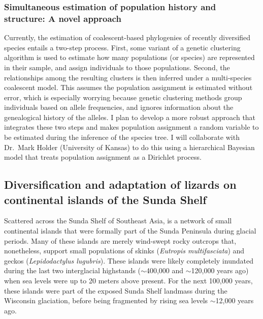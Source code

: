 \subsubsection*{Simultaneous estimation of population history and structure: A
novel approach}
Currently, the estimation of coalescent-based phylogenies of recently
diversified species entails a two-step process.
First, some variant of a genetic clustering algorithm is used to estimate how
many populations (or species) are represented in their sample, and assign
individuals to those populations.
Second, the relationships among the resulting clusters is then inferred under a
multi-species coalescent model.
This assumes the population assignment is estimated without error, which is
especially worrying because genetic clustering methods group individuals based
on allele frequencies, and ignores information about the genealogical history
of the alleles.
I plan to develop a more robust approach that integrates these two steps and
makes population assignment a random variable to be estimated during the
inference of the species tree.
I will collaborate with Dr.\ Mark Holder (University of Kansas) to do this
using a hierarchical Bayesian model that treats population assignment as a
Dirichlet process.

\subsection*{Diversification and adaptation of lizards on continental islands
of the Sunda Shelf}
Scattered across the Sunda Shelf of Southeast Asia, is a network of small
continental islands that were formally part of the Sunda Peninsula during
glacial periods.
Many of these islands are merely wind-swept rocky outcrops that, nonetheless,
support small populations of skinks (\emph{Eutropis multifasciata}) and geckos
(\emph{Lepidodactylus lugubris}).
These islands were likely completely inundated during the last two
interglacial highstands ($\sim$400,000 and $\sim$120,000 years ago) when sea
levels were up to 20 meters above present.
For the next 100,000 years, these islands were part of the exposed Sunda Shelf
landmass during the Wisconsin glaciation, before being fragmented by rising sea
levels $\sim$12,000 years ago.

